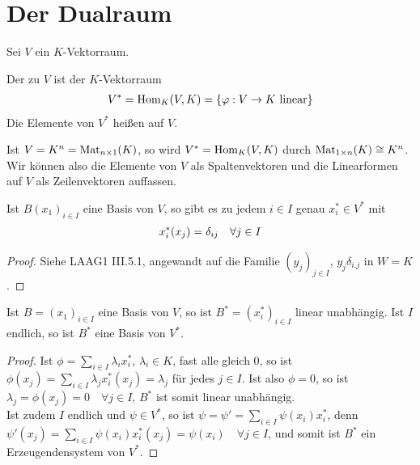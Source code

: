 \section{Der Dualraum}

Sei $V$ ein $K$-Vektorraum.

\begin{definition}[Dualraum]
	Der  zu $V$ ist der $K$-Vektorraum
	\begin{align}
		V^*=\operatorname{Hom}_K(V,K)=\{\varphi:V\to K\text{ linear}\}\notag
	\end{align}
	Die Elemente von $V^*$ heißen  auf $V$.
\end{definition}

\begin{example}
	Ist $V=K^n=\operatorname{Mat}_{n\times 1}(K)$, so wird $V^*=\operatorname{Hom}_K(V,K)$ durch $\operatorname{Mat}_{1\times n}(K)\cong K^n$. Wir können also die Elemente von $V$ als Spaltenvektoren und die Linearformen auf $V$ als Zeilenvektoren auffassen.
\end{example}

\begin{lemma}
	Ist $B(x_1)_{i\in I}$ eine Basis von $V$, so gibt es zu jedem $i\in I$ genau $x_i^*\in V^*$ mit 
	\begin{align}
		x_i^*(x_j)=\delta_{ij}\quad\forall j\in I\notag
	\end{align}
\end{lemma}
\begin{proof}
	Siehe LAAG1 III.5.1, angewandt auf die Familie $(y_j)_{j\in I}$, $y_j\delta_{i.j}$ in $W=K$. %
\end{proof}

\begin{proposition}
	Ist $B=(x_1)_{i\in I}$ eine Basis von $V$, so ist $B^*=(x_i^*)_{i\in I}$ linear unabhängig. Ist $I$ endlich, so ist $B^*$ eine Basis von $V^*$.
\end{proposition}
\begin{proof}
	Ist $\phi=\sum_{i\in I} \lambda_ix_i^*$, $\lambda_i\in K$, fast alle gleich 0, so ist $\phi(x_j)=\sum_{i\in I} \lambda_j x_i^*(x_j)=\lambda_j$ für jedes $j\in I$. Ist also $\phi=0$, so ist $\lambda_j=\phi(x_j)=0\quad\forall j\in I$, $B^*$ ist somit linear unabhängig. \\
	Ist zudem $I$ endlich und $\psi\in V^*$, so ist $\psi=\psi'=\sum_{i\in I} \psi(x_i)x_i^*$, denn $\psi'(x_j)=\sum_{i\in I} \psi(x_i)x_i^*(x_j)=\psi(x_i)\quad\forall j\in I$, und somit ist $B^*$ ein Erzeugendensystem von $V^*$.
\end{proof}

